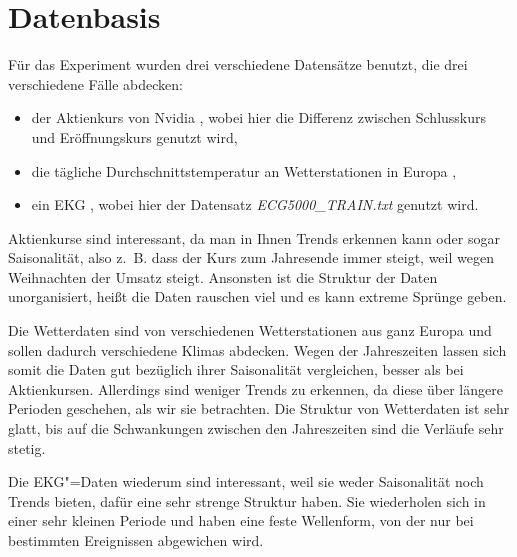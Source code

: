 \section{Datenbasis}
Für das Experiment wurden drei verschiedene Datensätze benutzt, die drei verschiedene Fälle abdecken: 
\begin{itemize}
    \item der Aktienkurs von Nvidia \cite{nvidiaStock}, wobei hier die Differenz zwischen Schlusskurs und Eröffnungskurs genutzt wird,
    \item die tägliche Durchschnittstemperatur an Wetterstationen in Europa \cite{ecadWetterdaten},
    \item ein EKG \cite{ecg500}, wobei hier der Datensatz \textit{ECG5000\_TRAIN.txt} genutzt wird.
\end{itemize}

Aktienkurse sind interessant, da man in Ihnen Trends erkennen kann oder sogar Saisonalität, also z.~B. dass der Kurs zum Jahresende immer steigt, weil wegen Weihnachten der Umsatz steigt. Ansonsten ist die Struktur der Daten unorganisiert, heißt die Daten rauschen viel und es kann extreme Sprünge geben.

Die Wetterdaten sind von verschiedenen Wetterstationen aus ganz Europa und sollen dadurch verschiedene Klimas abdecken. Wegen der Jahreszeiten lassen sich somit die Daten gut bezüglich ihrer Saisonalität vergleichen, besser als bei Aktienkursen. Allerdings sind weniger Trends zu erkennen, da diese über längere Perioden geschehen, als wir sie betrachten. Die Struktur von Wetterdaten ist sehr glatt, bis auf die Schwankungen zwischen den Jahreszeiten sind die Verläufe sehr stetig.

Die EKG"=Daten wiederum sind interessant, weil sie weder Saisonalität noch Trends bieten, dafür eine sehr strenge Struktur haben. Sie wiederholen sich in einer sehr kleinen Periode und haben eine feste Wellenform, von der nur bei bestimmten Ereignissen abgewichen wird.